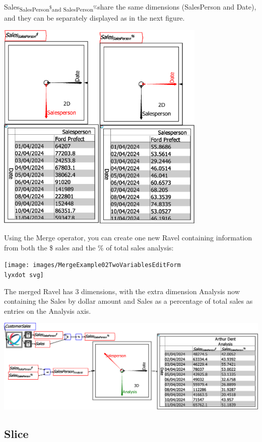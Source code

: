 Sales\textsubscript{SalesPerson\textsuperscript{\$}and SalesPerson\textsuperscript{\%}}share
the same dimensions (SalesPerson and Date), and they can be separately
displayed as in the next figure.

\includegraphics[width=10cm]{images/MergeExample02TwoVariablesSeparate}

Using the Merge operator, you can create one new Ravel containing
information from both the \$ sales and the \% of total sales analysis:

\texttt{[image: images/MergeExample02TwoVariablesEditForm\\lyxdot svg]}

The merged Ravel has 3 dimensions, with the extra dimension Analysis
now containing the Sales by dollar amount and Sales as a percentage
of total sales as entries on the Analysis axis.

\includegraphics[width=15cm]{images/MergeExample03TwoVariablesMerged}

\subsection{Slice}

